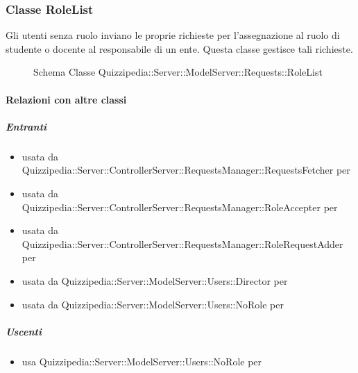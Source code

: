 \subsubsection{Classe RoleList}
Gli utenti senza ruolo inviano le proprie richieste per l'assegnazione al ruolo di studente o docente al responsabile di un ente. Questa classe gestisce tali richieste.
\begin{figure}[H]
\centering
\noindent{}
\caption[Schema Classe RoleList]{Schema Classe Quizzipedia::Server::ModelServer::Requests::RoleList}
\end{figure}
\paragraph{Relazioni con altre classi}
\subparagraph{Entranti}
\begin{itemize}
\item usata da Quizzipedia::Server::ControllerServer::RequestsManager::RequestsFetcher per 
\item usata da Quizzipedia::Server::ControllerServer::RequestsManager::RoleAccepter per 
\item usata da Quizzipedia::Server::ControllerServer::RequestsManager::RoleRequestAdder per 
\item usata da Quizzipedia::Server::ModelServer::Users::Director per 
\item usata da Quizzipedia::Server::ModelServer::Users::NoRole per 
\end{itemize}
\subparagraph{Uscenti}
\begin{itemize}
\item usa Quizzipedia::Server::ModelServer::Users::NoRole per 
\end{itemize}

